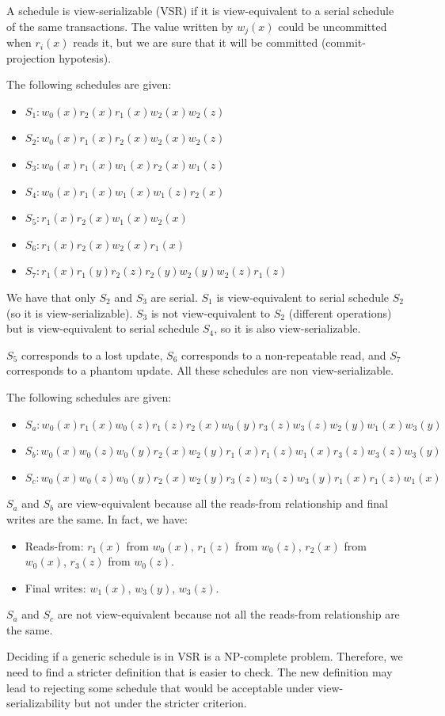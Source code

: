 \documentclass[12pt, a4paper]{report}
\newtheorem[style=M,bodystyle=\normalfont]{theorem}{Theorem}
\newtheorem[style=M,bodystyle=\normalfont]{corollary}{Corollary}
\newtheorem[style=M,bodystyle=\normalfont]{lemma}{Lemma}
\newtheorem[style=M,bodystyle=\normalfont]{definition}{Definition}
\begin{document}
    A schedule is view-serializable (VSR) if it is view-equivalent to a serial schedule of the same transactions. The value written by $w_j(x)$ could be uncommitted when $r_i(x)$ 
    reads it, but we are sure that it will be committed (commit-projection hypotesis).
    \begin{example}
        The following schedules are given:
        \begin{itemize}
            \item $S_1: w_0(x) r_2(x) r_1(x) w_2(x) w_2(z)$
            \item $S_2: w_0(x) r_1(x) r_2(x) w_2(x) w_2(z)$
            \item $S_3: w_0(x) r_1(x) w_1(x) r_2(x) w_1(z)$
            \item $S_4: w_0(x) r_1(x) w_1(x) w_1(z) r_2(x)$
            \item $S_5: r_1(x) r_2(x) w_1(x) w_2(x)$
            \item $S_6: r_1(x) r_2(x) w_2(x) r_1(x)$
            \item $S_7: r_1(x) r_1(y) r_2(z) r_2(y) w_2(y) w_2(z) r_1(z)$
        \end{itemize}
        We have that only $S_2$ and $S_3$ are serial. $S_1$ is view-equivalent to serial schedule $S_2$ (so it is view-serializable). 
        $S_3$ is not view-equivalent to $S_2$ (different operations) but is view-equivalent to serial schedule $S_4$, so it is also view-serializable. 

        $S_5$ corresponds to a lost update, $S_6$ corresponds to a non-repeatable read, and $S_7$ corresponds to a phantom update. All these schedules are non view-serializable. 
        
        The following schedules are given:
        \begin{itemize}
            \item $S_a: w_0(x) r_1(x) w_0(z) r_1(z) r_2(x) w_0(y) r_3(z) w_3(z) w_2(y) w_1(x) w_3(y)$
            \item $S_b: w_0(x) w_0(z) w_0(y) r_2(x) w_2(y) r_1(x) r_1(z) w_1(x) r_3(z) w_3(z) w_3(y)$
            \item $S_c: w_0(x) w_0(z) w_0(y) r_2(x) w_2(y) r_3(z) w_3(z) w_3(y) r_1(x) r_1(z) w_1(x)$
        \end{itemize}
        $S_a$ and $S_b$ are view-equivalent because all the reads-from relationship and final writes are the same. In fact, we have: 
        \begin{itemize}
            \item Reads-from: $r_1(x)$ from $w_0(x)$, $r_1(z)$ from $w_0(z)$, $r_2(x)$ from $w_0(x)$, $r_3(z)$ from $w_0(z)$.
            \item Final writes: $w_1(x)$, $w_3(y)$, $w_3(z)$.
        \end{itemize}
        $S_a$ and $S_c$ are not view-equivalent because not all the reads-from relationship are the same. 
    \end{example}
    Deciding if a generic schedule is in VSR is a NP-complete problem. Therefore, we need to find a stricter definition that is easier to check. The new definition may lead to 
    rejecting some schedule that would be acceptable under view-serializability but not under the stricter criterion.
    
\end{document}
